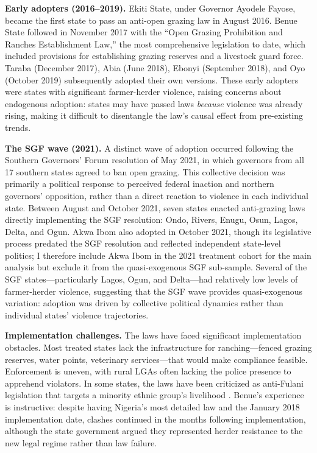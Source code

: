 \documentclass[12pt]{article}
\begin{document}
\textbf{Early adopters (2016--2019).} Ekiti State, under Governor Ayodele Fayose, became the first state to pass an anti-open grazing law in August 2016. Benue State followed in November 2017 with the ``Open Grazing Prohibition and Ranches Establishment Law,'' the most comprehensive legislation to date, which included provisions for establishing grazing reserves and a livestock guard force. Taraba (December 2017), Abia (June 2018), Ebonyi (September 2018), and Oyo (October 2019) subsequently adopted their own versions. These early adopters were states with significant farmer-herder violence, raising concerns about endogenous adoption: states may have passed laws \textit{because} violence was already rising, making it difficult to disentangle the law's causal effect from pre-existing trends.

\textbf{The SGF wave (2021).} A distinct wave of adoption occurred following the Southern Governors' Forum resolution of May 2021, in which governors from all 17 southern states agreed to ban open grazing. This collective decision was primarily a political response to perceived federal inaction and northern governors' opposition, rather than a direct reaction to violence in each individual state. Between August and October 2021, seven states enacted anti-grazing laws directly implementing the SGF resolution: Ondo, Rivers, Enugu, Osun, Lagos, Delta, and Ogun. Akwa Ibom also adopted in October 2021, though its legislative process predated the SGF resolution and reflected independent state-level politics; I therefore include Akwa Ibom in the 2021 treatment cohort for the main analysis but exclude it from the quasi-exogenous SGF sub-sample. Several of the SGF states---particularly Lagos, Ogun, and Delta---had relatively low levels of farmer-herder violence, suggesting that the SGF wave provides quasi-exogenous variation: adoption was driven by collective political dynamics rather than individual states' violence trajectories.

\textbf{Implementation challenges.} The laws have faced significant implementation obstacles. Most treated states lack the infrastructure for ranching---fenced grazing reserves, water points, veterinary services---that would make compliance feasible. Enforcement is uneven, with rural LGAs often lacking the police presence to apprehend violators. In some states, the laws have been criticized as anti-Fulani legislation that targets a minority ethnic group's livelihood \citep{ochonu2022anti}. Benue's experience is instructive: despite having Nigeria's most detailed law and the January 2018 implementation date, clashes continued in the months following implementation, although the state government argued they represented herder resistance to the new legal regime rather than law failure.
\end{document}
